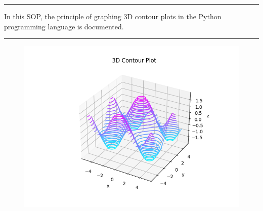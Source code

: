 \documentclass[
11pt, %
a4paper, %
oneside, %
headinclude,footinclude, %
BCOR5mm, %
]{scrartcl}
\renewenvironment{abstract}
 {\quotation\small\noindent\rule{\linewidth}{.5pt}\par\smallskip
  {\centering\bfseries\abstractname\par}\medskip}
 {\par\noindent\rule{\linewidth}{.5pt}\endquotation}
\begin{document}
\begin{abstract}\centering\noindent %
In this SOP, the principle of graphing 3D contour plots in the Python programming language is documented.
\end{abstract}
\vspace*{0.15in}
\begin{figure}
\centering %
\includegraphics[width=0.6\columnwidth]{Figures/Figure0.png} %
\end{figure}

\makeatletter
{} %
\makeatother

\setcounter{tocdepth}{2} %

\pagebreak
\tableofcontents %
\listoffigures %


\end{document}
